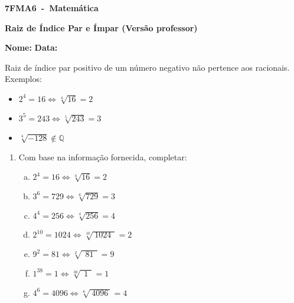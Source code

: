\documentclass[a4paper,14pt]{article}
\begin{document}
	
	\noindent\textbf{7FMA6~-~Matemática} 
	
	\begin{center}
		\textbf{Raiz de Índice Par e Ímpar (Versão professor)}
	\end{center}
	
	\bigskip
	
	\noindent\textbf{Nome:} \underline{\hspace{10cm}}
    \noindent\textbf{Data:} \underline{\hspace{4cm}}
	
	\bigskip
	
	\begin{multicols}{2}
        \noindent Raiz de índice par positivo de um número negativo não pertence aos racionais. \\
        Exemplos:
    \begin{itemize}
    	\item $2^4 = 16 \Leftrightarrow \sqrt[4]{16} = 2$
    	\item $3^5 = 243 \Leftrightarrow \sqrt[5]{243} = 3$
    	\item $\sqrt[4]{-128} \notin \mathbb{Q}$
    \end{itemize}
	\begin{enumerate}
		
		\item Com base na informação fornecida, completar:
		\begin{enumerate}[a)]
			\item $2^4 = 16 \Leftrightarrow \sqrt[4]{16} = 2$
			\item $3^6 = 729 \Leftrightarrow \sqrt[6]{729} = 3$
			\item $4^4 = 256 \Leftrightarrow \sqrt[4]{256} = 4$
			\item $2^{10} = 1024 \Leftrightarrow \sqrt[10]{~1024~~} = 2$
			\item $9^2 = 81 \Leftrightarrow \sqrt[2]{~~81~~} = 9$
			\item $1^{38} = 1 \Leftrightarrow \sqrt[38]{~~1~~} = 1$
			\item $4^6 = 4096 \Leftrightarrow \sqrt[6]{~4096~} = 4$
	    \end{enumerate}
    

\end{enumerate}
\end{multicols}
\end{document}
